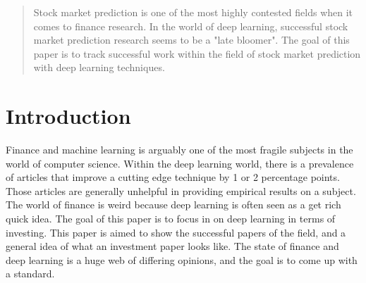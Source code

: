 \documentclass{article}
\theoremstyle{plain}
\theoremstyle{definition}
\numberwithin{equation}{section}
\numberwithin{theorem}{section}
\numberwithin{lemma}{section}
\numberwithin{definition}{section}
\numberwithin{proposition}{section}
\numberwithin{corollary}{section}
\begin{document}
	
	
	
	\begin{abstract}
		Stock market prediction is one of the most highly contested fields when it comes to finance research. In the world of deep learning, successful stock market prediction research seems to be a "late bloomer". The goal of this paper is to track successful work within the field of stock market prediction with deep learning techniques.
	\end{abstract}
	
	\section{Introduction}
	Finance and machine learning is arguably one of the most fragile subjects in the world of computer science. Within the deep learning world, there is a prevalence of articles that improve a cutting edge technique by 1 or 2 percentage points. Those articles are generally unhelpful in providing empirical results on a subject. The world of finance is weird because deep learning is often seen as a get rich quick idea. The goal of this paper is to focus in on deep learning in terms of investing. This paper is aimed to show the successful papers of the field, and a general idea of what an investment paper looks like. The state of finance and deep learning is a huge web of differing opinions, and the goal is to come up with a standard.
	
\end{document}
